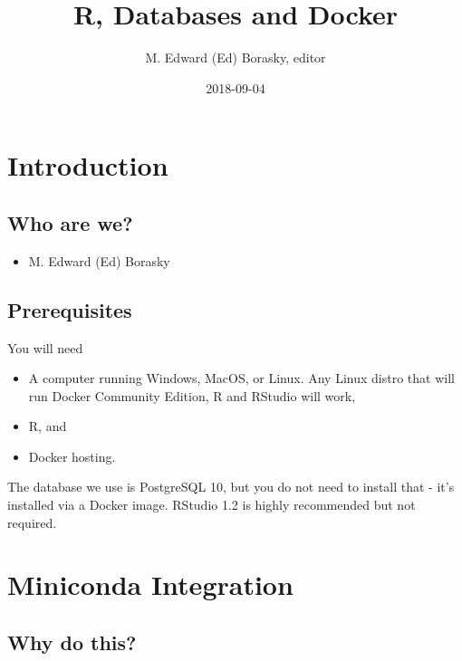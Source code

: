 \documentclass[]{book}
\title{R, Databases and Docker}
\author{M. Edward (Ed) Borasky, editor}
\date{2018-09-04}
\providecommand{\tightlist}{%
  \setlength{\itemsep}{0pt}\setlength{\parskip}{0pt}}
\theoremstyle{definition}
\theoremstyle{definition}
\theoremstyle{definition}
\theoremstyle{remark}
\begin{document}
\maketitle

{
\setcounter{tocdepth}{1}
\tableofcontents
}
\hypertarget{introduction}{%
\chapter{Introduction}\label{introduction}}

\hypertarget{who-are-we}{%
\section{Who are we?}\label{who-are-we}}

\begin{itemize}
\tightlist
\item
  M. Edward (Ed) Borasky
\end{itemize}

\hypertarget{prerequisites}{%
\section{Prerequisites}\label{prerequisites}}

You will need

\begin{itemize}
\tightlist
\item
  A computer running Windows, MacOS, or Linux. Any Linux distro that
  will run Docker Community Edition, R and RStudio will work,
\item
  R, and
\item
  Docker hosting.
\end{itemize}

The database we use is PostgreSQL 10, but you do not need to install
that - it's installed via a Docker image. RStudio 1.2 is highly
recommended but not required.

\hypertarget{miniconda-integration}{%
\chapter{Miniconda Integration}\label{miniconda-integration}}

\hypertarget{why-do-this}{%
\section{Why do this?}\label{why-do-this}}
\end{document}
